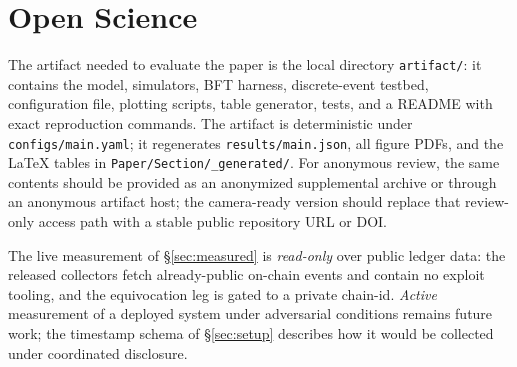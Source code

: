 \section*{Open Science}

The artifact needed to evaluate the paper is the local directory \texttt{artifact/}: it contains the
model, simulators, BFT harness, discrete-event testbed, configuration file, plotting scripts, table
generator, tests, and a README with exact reproduction commands. The artifact is deterministic under
\texttt{configs/main.yaml}; it regenerates \texttt{results/main.json}, all figure PDFs, and the
\LaTeX{} tables in \texttt{Paper/Section/\_generated/}. For anonymous review, the same contents should be
provided as an anonymized supplemental archive or through an anonymous artifact host; the
camera-ready version should replace that review-only access path with a stable public repository
URL or DOI.

The live measurement of \S\ref{sec:measured} is \emph{read-only} over public ledger data: the released
collectors fetch already-public on-chain events and contain no exploit tooling, and the
equivocation leg is gated to a private chain-id. \emph{Active} measurement of a deployed system under
adversarial conditions remains future work; the timestamp schema of \S\ref{sec:setup} describes how it
would be collected under coordinated disclosure.
